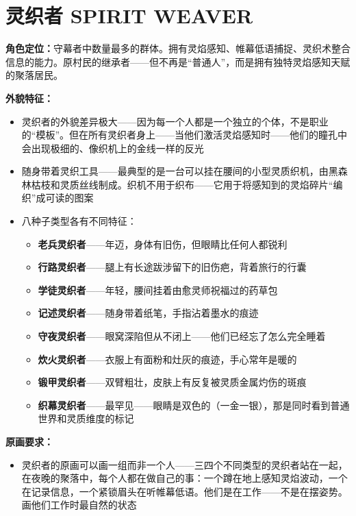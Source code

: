 \documentclass[12pt,a4paper,openany]{ctexbook}
\begin{document}
\section{灵织者 SPIRIT WEAVER}

\textbf{角色定位：}守幕者中数量最多的群体。拥有灵焰感知、帷幕低语捕捉、灵织术整合信息的能力。原村民的继承者——但不再是“普通人”，而是拥有独特灵焰感知天赋的聚落居民。

\textbf{外貌特征：}
\begin{itemize}
    \item 灵织者的外貌差异极大——因为每一个人都是一个独立的个体，不是职业的“模板”。但在所有灵织者身上——当他们激活灵焰感知时——他们的瞳孔中会出现极细的、像织机上的金线一样的反光
    \item 随身带着灵织工具——最典型的是一台可以挂在腰间的小型灵质织机，由黑森林枯枝和灵质丝线制成。织机不用于织布——它用于将感知到的灵焰碎片“编织”成可读的图案
    \item 八种子类型各有不同特征：
    \begin{itemize}
        \item \textbf{老兵灵织者}——年迈，身体有旧伤，但眼睛比任何人都锐利
        \item \textbf{行路灵织者}——腿上有长途跋涉留下的旧伤疤，背着旅行的行囊
        \item \textbf{学徒灵织者}——年轻，腰间挂着由愈灵师祝福过的药草包
        \item \textbf{记述灵织者}——随身带着纸笔，手指沾着墨水的痕迹
        \item \textbf{守夜灵织者}——眼窝深陷但从不闭上——他们已经忘了怎么完全睡着
        \item \textbf{炊火灵织者}——衣服上有面粉和灶灰的痕迹，手心常年是暖的
        \item \textbf{锻甲灵织者}——双臂粗壮，皮肤上有反复被灵质金属灼伤的斑痕
        \item \textbf{织幕灵织者}——最罕见——眼睛是双色的（一金一银），那是同时看到普通世界和灵质维度的标记
    \end{itemize}
\end{itemize}

\textbf{原画要求：}
\begin{itemize}
    \item 灵织者的原画可以画一组而非一个人——三四个不同类型的灵织者站在一起，在夜晚的聚落中，每个人都在做自己的事：一个蹲在地上感知灵焰波动，一个在记录信息，一个紧锁眉头在听帷幕低语。他们是在工作——不是在摆姿势。画他们工作时最自然的状态
\end{itemize}
\end{document}
